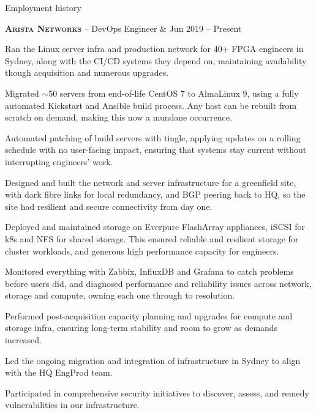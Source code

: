 \documentclass[a4paper,10pt]{article}
\begin{document}
\begin{resumeblock}{Employment history}

\begin{resumejob}{%
\textbf{\textsc{Arista Networks}} -- DevOps Engineer & Jun 2019 -- Present
}
%
\item Ran the Linux server infra and production network for 40+ FPGA engineers in Sydney, along with the CI/CD systems they depend on, maintaining availability though acquisition and numerous upgrades.
\item Migrated $\sim$50 servers from end-of-life CentOS 7 to AlmaLinux 9, using a fully automated Kickstart and Ansible build process. Any host can be rebuilt from scratch on demand, making this now a mundane occurrence.
\item Automated patching of build servers with tingle, applying updates on a rolling schedule with no user-facing impact, ensuring that systems stay current without interrupting engineers' work.
\item Designed and built the network and server infrastructure for a greenfield site, with dark fibre links for local redundancy, and BGP peering back to HQ, so the site had resilient and secure connectivity from day one.
\item Deployed and maintained storage on Everpure FlashArray appliances, iSCSI for k8s and NFS for shared storage. This ensured reliable and resilient storage for cluster workloads, and generous high performance capacity for engineers.
\item Monitored everything with Zabbix, InfluxDB and Grafana to catch problems before users did, and diagnosed performance and reliability issues across network, storage and compute, owning each one through to resolution.
\item Performed post-acquisition capacity planning and upgrades for compute and storage infra, ensuring long-term stability and room to grow as demands increased.
\item Led the ongoing migration and integration of infrastructure in Sydney to align with the HQ EngProd team.
\item Participated in comprehensive security initiatives to discover, assess, and remedy vulnerabilities in our infrastructure.
\end{resumejob}
\vspace{3mm}


\end{resumeblock}
\end{document}
